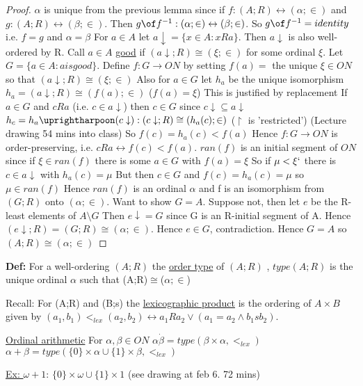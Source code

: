 \documentclass{article}
\begin{document}
    \begin{proof}
        $\alpha$ is unique from the previous lemma since if $f : (A;R) \leftrightarrow (\alpha;\in)$ and $g : (A;R) \leftrightarrow (\beta;\in)$.
        Then $g \of f^{-1} : (\alpha;\in) \leftrightarrow (\beta;\in)$.
        So $g \of f^{-1} = identity$ i.e. $f=g$ and $\alpha = \beta$
        For $a \in A$ let $a \downarrow = \{x\in A : x R a\}$.
        Then $a \downarrow$ is also well-ordered by R.
        Call $a \in A$ \underline{good} if $(a \downarrow;R) \cong (\xi; \in)$ for some ordinal $\xi$.
        Let $G = \{a \in A : a is good\}$.
        Define $f : G \rightarrow ON$ by setting $f(a) = $ the unique $\xi \in ON$ so that $(a\downarrow;R)\cong(\xi;\in)$
        Also for $a \in G$ let $h_a$ be the unique isomorphism $h_a=(a\downarrow;R)\cong(f(a);\in)$ ($f(a)=\xi$)
        This is justified by replacement
        If $a\in G$ and $c R a$ (i.e. $c \in a\downarrow$) then $c \in G$ since $c \downarrow \subseteq a\downarrow$
        $h_c = h_a \uprightharpoon(c\downarrow): (c\downarrow;R)\cong(h_a(c);\in)$
        ($\upharpoonright$ is 'restricted')
        (Lecture drawing 54 mins into class)
        So $f(c) = h_a(c) < f(a)$
        Hence $f : G \rightarrow ON$ is order-preserving, i.e. $cRa \leftrightarrow f(c) < f(a)$.
        $ran(f)$ is an initial segment of $ON$ since if $\xi \in  ran(f)$ there is some $a \in G$ with $f(a) = \xi$
        So if $\mu < \xi`$ there is $c \in a\downarrow$ with $h_a(c) = \mu$
        But then $c \in G$ and $f(c) = h_a(c) = \mu$ so $\mu \in ran(f)$
        Hence $ran(f)$ is an ordinal $\alpha$ and f is an isomorphism from $(G;R)$ onto $(\alpha;\in)$.
        Want to show $G=A$.
        Suppose not, then let $e$ be the R-least elements of $A \setminus G$
        Then $e \downarrow = G$ since G is an R-initial segment of A.
        Hence $(e \downarrow;R) = (G;R) \cong (\alpha;\in)$.
        Hence $e \in G$, contradiction.
        Hence $G=A$ so $(A;R)\cong(\alpha;\in)$
    \end{proof}

    \textbf{Def: } For a well-ordering $(A;R)$ the \underline{order type} of $(A;R)$ , $type(A;R)$ is the unique ordinal $\alpha$ such that (A;R)$\cong$($\alpha;\in$)

    Recall: For (A;R) and (B;s) the \underline{lexicographic product} is the ordering of $A \times B$ given by $(a_1,b_1) <_{lex}(a_2,b_2) \leftrightarrow a_1 R a_2 \vee (a_1 = a_2 \wedge b_1 s b_2)$.

     \underline{Ordinal arithmetic}
    For $\alpha,\beta \in ON$
    $\alpha \dot \beta = type(\beta \times \alpha, <_{lex})$
    $\alpha + \beta = type(\{0\}\times \alpha \cup \{1\} \times \beta, <_{lex})$

    \underline{Ex: } $\omega + 1$: $\{0\} \times \omega \cup \{1\}\times 1$ (see drawing at feb 6. 72 mins)
\end{document}
